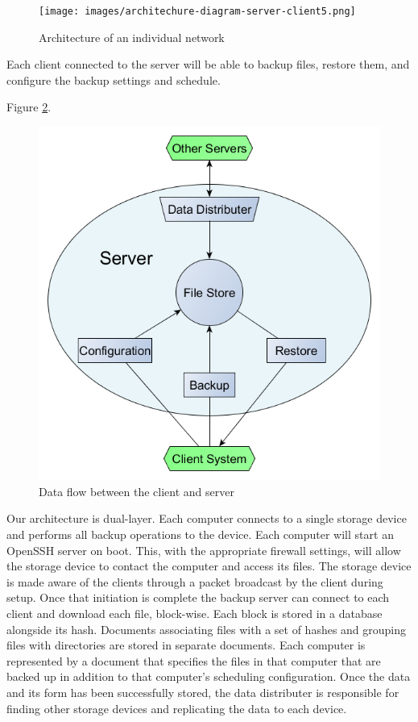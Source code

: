 \begin{figure}[hb]
\centering
\texttt{[image: images/architechure-diagram-server-client5.png]}
\caption{Architecture of an individual network}
\label{fig:indivNetwork}
\end{figure}

Each client connected to the server will be able to backup files, restore them, and configure the backup settings and schedule.


Figure \ref{fig:clientServer}.

\begin{figure}[hb]
\centering
\includegraphics[scale=0.5]{images/architechure-diagram2.png}
\caption{Data flow between the client and server}
\label{fig:clientServer}
\end{figure}

Our architecture is dual-layer. Each computer connects to a single storage
device and performs all backup operations to the device. Each computer will start
an OpenSSH server on boot. This, with the appropriate firewall settings, will
allow the storage device to contact the computer and access its files. The
storage device is made aware of the clients through a packet broadcast by the
client during setup. Once that initiation is complete the backup server can
connect to each client and download each file, block-wise. Each block is stored
in a database alongside its hash.
Documents associating files with a set of hashes and grouping files with
directories are stored in separate documents. Each computer is represented by a
document that specifies the files in that computer that are backed up in
addition to that computer's scheduling configuration. Once the data and its form
has been successfully stored, the data distributer is responsible for
finding other storage devices and replicating the data to each device.

